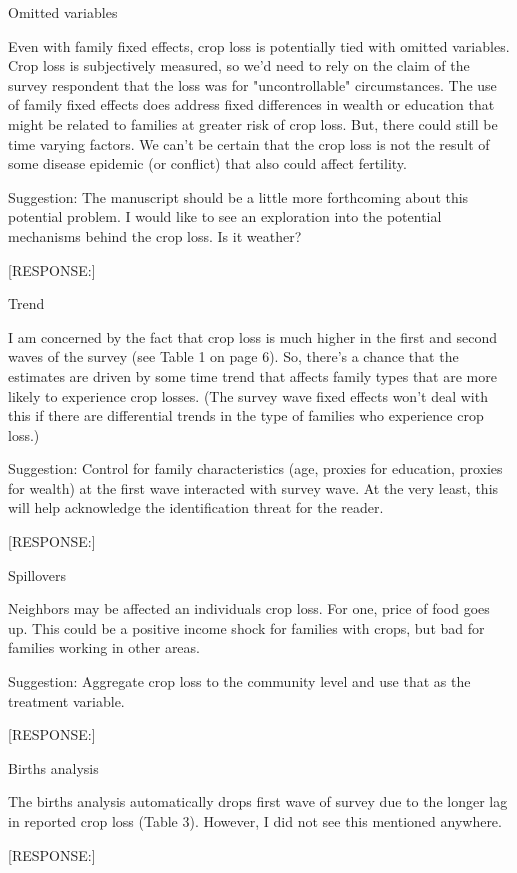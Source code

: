 \documentclass[letterpaper,12pt]{article}
\begin{document}
\begin{description}

\item Omitted variables

Even with family fixed effects, crop loss is potentially tied with
omitted variables. Crop loss is subjectively measured, so we'd need to
rely on the claim of the survey respondent that the loss was for
"uncontrollable" circumstances. The use of family fixed effects does
address fixed differences in wealth or education that might be related
to families at greater risk of crop loss. But, there could still be time
varying factors. We can't be certain that the crop loss is not the
result of some disease epidemic (or conflict) that also could affect
fertility.

Suggestion: The manuscript should be a little more forthcoming about
this potential problem. I would like to see an exploration into the
potential mechanisms behind the crop loss. Is it weather?

[RESPONSE:]


\item Trend

I am concerned by the fact that crop loss is much higher in the first
and second waves of the survey (see Table 1 on page 6). So, there's a
chance that the estimates are driven by some time trend that affects
family types that are more likely to experience crop losses. (The survey
wave fixed effects won't deal with this if there are differential trends
in the type of families who experience crop loss.)

Suggestion: Control for family characteristics (age, proxies for
education, proxies for wealth) at the first wave interacted with survey
wave. At the very least, this will help acknowledge the identification
threat for the reader.


[RESPONSE:]


\item Spillovers

Neighbors may be affected an individuals crop loss. For one, price of
food goes up. This could be a positive income shock for families with
crops, but bad for families working in other areas.

Suggestion: Aggregate crop loss to the community level and use that as
the treatment variable.


[RESPONSE:]


\item Births analysis

The births analysis automatically drops first wave of survey due to the
longer lag in reported crop loss (Table 3). However, I did not see this
mentioned anywhere.

[RESPONSE:]


\end{description}


\newpage


\end{document}
